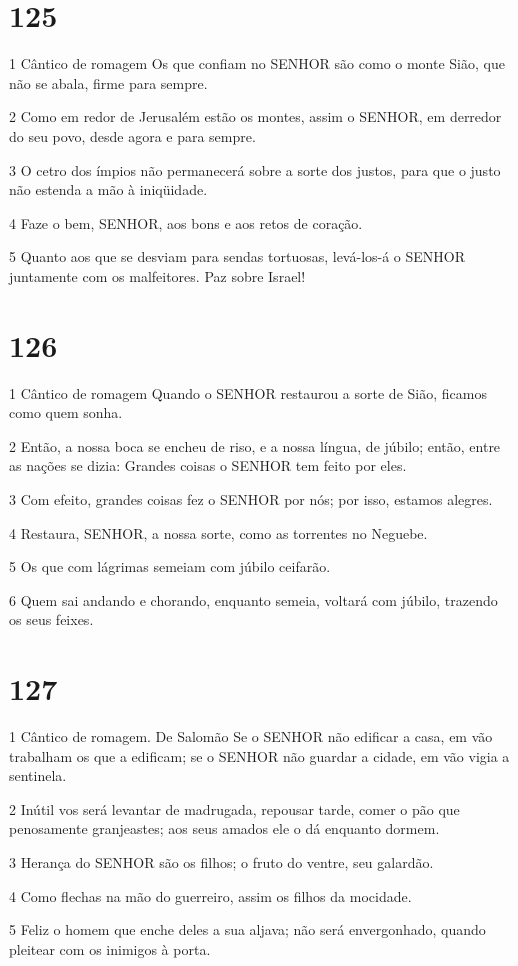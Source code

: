 \chapter{125}

\par 1 Cântico de romagem Os que confiam no SENHOR são como o monte Sião, que não se abala, firme para sempre.
\par 2 Como em redor de Jerusalém estão os montes, assim o SENHOR, em derredor do seu povo, desde agora e para sempre.
\par 3 O cetro dos ímpios não permanecerá sobre a sorte dos justos, para que o justo não estenda a mão à iniqüidade.
\par 4 Faze o bem, SENHOR, aos bons e aos retos de coração.
\par 5 Quanto aos que se desviam para sendas tortuosas, levá-los-á o SENHOR juntamente com os malfeitores. Paz sobre Israel!

\chapter{126}

\par 1 Cântico de romagem Quando o SENHOR restaurou a sorte de Sião, ficamos como quem sonha.
\par 2 Então, a nossa boca se encheu de riso, e a nossa língua, de júbilo; então, entre as nações se dizia: Grandes coisas o SENHOR tem feito por eles.
\par 3 Com efeito, grandes coisas fez o SENHOR por nós; por isso, estamos alegres.
\par 4 Restaura, SENHOR, a nossa sorte, como as torrentes no Neguebe.
\par 5 Os que com lágrimas semeiam com júbilo ceifarão.
\par 6 Quem sai andando e chorando, enquanto semeia, voltará com júbilo, trazendo os seus feixes.

\chapter{127}

\par 1 Cântico de romagem. De Salomão Se o SENHOR não edificar a casa, em vão trabalham os que a edificam; se o SENHOR não guardar a cidade, em vão vigia a sentinela.
\par 2 Inútil vos será levantar de madrugada, repousar tarde, comer o pão que penosamente granjeastes; aos seus amados ele o dá enquanto dormem.
\par 3 Herança do SENHOR são os filhos; o fruto do ventre, seu galardão.
\par 4 Como flechas na mão do guerreiro, assim os filhos da mocidade.
\par 5 Feliz o homem que enche deles a sua aljava; não será envergonhado, quando pleitear com os inimigos à porta.

